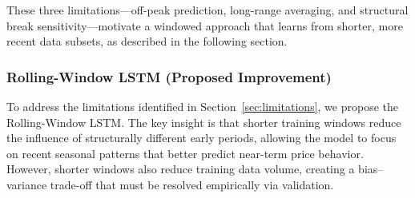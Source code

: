 \documentclass[journal]{IEEEtran}
\begin{document}
These three limitations---off-peak prediction, long-range averaging, and structural break sensitivity---motivate a windowed approach that learns from shorter, more recent data subsets, as described in the following section.

\subsubsection{Rolling-Window LSTM (Proposed Improvement)}
\label{sec:rwlstm}

To address the limitations identified in Section~\ref{sec:limitations}, we propose the Rolling-Window LSTM. The key insight is that shorter training windows reduce the influence of structurally different early periods, allowing the model to focus on recent seasonal patterns that better predict near-term price behavior. However, shorter windows also reduce training data volume, creating a bias--variance trade-off that must be resolved empirically via validation.
\end{document}
